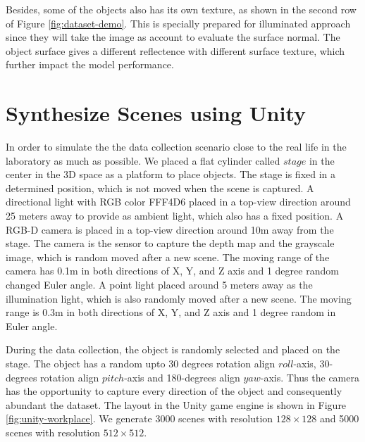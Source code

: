 Besides, some of the objects also has its own texture, as shown in the second row of Figure \ref{fig:dataset-demo}. This is specially prepared for illuminated approach since they will take the image as account to evaluate the surface normal. The object surface gives a different reflectence with different surface texture, which further impact the model performance. 

\newcommand{\col}[1]{%
	\textcolor{#1}{\vrule width 0.5cm}}
\section{Synthesize Scenes using Unity}
In order to simulate the the data collection scenario close to the real life in the laboratory as much as possible. We placed a flat cylinder called $ stage $ in the center in the 3D space as a platform to place objects. The stage is fixed in a determined position, which is not moved when the scene is captured. 
A directional light with RGB color FFF4D6 \col{direction-light-color}  placed in a top-view direction around 25 meters away to provide as ambient light, which also has a fixed position.
A RGB-D camera is placed in a top-view direction around 10m away from the stage. The camera is the sensor to capture the depth map and the grayscale image, which is random moved after a new scene. The moving range of the camera has 0.1m in both directions of X, Y, and Z axis and 1 degree random changed Euler angle. 
A point light placed around 5 meters away as the illumination light, which is also randomly moved after a new scene. The moving range is 0.3m in both directions of X, Y, and Z axis and 1 degree random in Euler angle.

During the data collection, the object is randomly selected and placed on the stage. The object has a random upto 30 degrees rotation align $ roll $-axis, 30-degrees rotation align $ pitch $-axis and 180-degrees align $ yaw $-axis. Thus the camera has the opportunity to capture every direction of the object and consequently abundant the dataset. The layout in the Unity game engine is shown in Figure \ref{fig:unity-workplace}. We generate 3000 scenes with resolution $ 128\times128 $ and 5000 scenes with resolution $ 512\times512 $.

